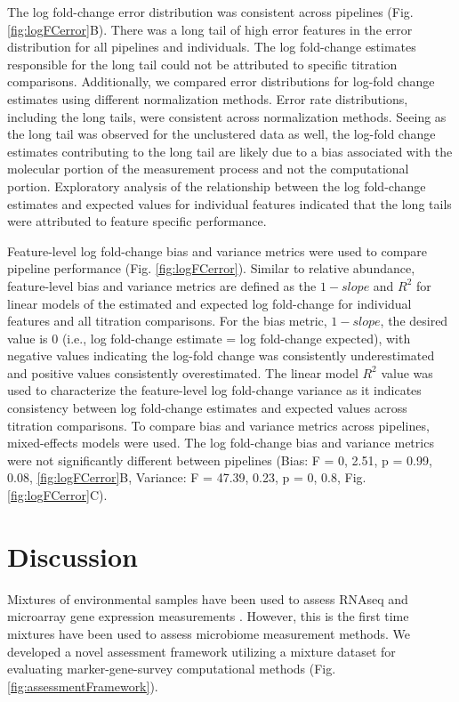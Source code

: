 \documentclass{bmcart}
\begin{document}
The log fold-change error distribution was consistent across pipelines
(Fig. \ref{fig:logFCerror}B). There was a long tail of high error
features in the error distribution for all pipelines and individuals.
The log fold-change estimates responsible for the long tail could not be
attributed to specific titration comparisons. Additionally, we compared
error distributions for log-fold change estimates using
different normalization methods. Error rate distributions, including the
long tails, were consistent across normalization methods. Seeing
as the long tail was observed for the unclustered data as well, the
log-fold change estimates contributing to the long tail are likely due
to a bias associated with the molecular portion of the
measurement process and not the computational portion. Exploratory
analysis of the relationship between the log fold-change estimates and
expected values for individual features indicated that the long tails
were attributed to feature specific performance.

Feature-level log fold-change bias and variance metrics were used to
compare pipeline performance (Fig. \ref{fig:logFCerror}). Similar to
relative abundance, feature-level bias and variance metrics are defined
as the \(1 - slope\) and \(R^2\) for linear models of the estimated and
expected log fold-change for individual features and all titration
comparisons. For the bias metric, \(1 - slope\), the desired value is 0
(i.e., log fold-change estimate = log fold-change expected), with
negative values indicating the log-fold change was consistently
underestimated and positive values consistently overestimated. The
linear model \(R^2\) value was used to characterize the feature-level
log fold-change variance as it indicates consistency between log
fold-change estimates and expected values across titration comparisons.
To compare bias and variance metrics across pipelines, mixed-effects
models were used. The log fold-change bias and variance metrics were not
significantly different between pipelines (Bias: F = 0, 2.51, p = 0.99,
0.08, \ref{fig:logFCerror}B, Variance: F = 47.39, 0.23, p = 0, 0.8, Fig.
\ref{fig:logFCerror}C).


\section*{Discussion}
Mixtures of environmental samples have been used to assess
RNAseq and microarray gene expression measurements \cite{parsons2015using, pine2011adaptable, thompson2005use}.
However, this is the first time mixtures have been used to assess microbiome measurement
methods. We developed a novel assessment framework utilizing a mixture dataset
for evaluating marker-gene-survey computational methods (Fig. \ref{fig:assessmentFramework}).
\end{document}
